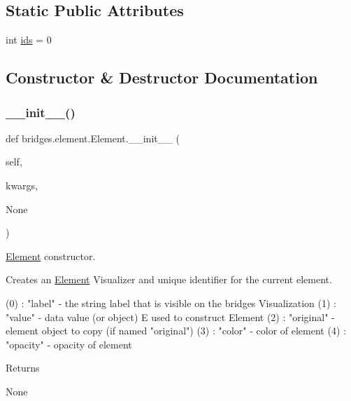 \subsection*{Static Public Attributes}
\begin{DoxyCompactItemize}
\item 
int \hyperlink{classbridges_1_1element_1_1_element_a61f02c915a65554b76dd6534e5a4d834}{ids} = 0
\end{DoxyCompactItemize}


\subsection{Constructor \& Destructor Documentation}
\mbox{\label{classbridges_1_1element_1_1_element_ac0291307e216e5f2da60a340a1e2142d}} 
\subsubsection{\texorpdfstring{\+\_\+\+\_\+init\+\_\+\+\_\+()}{\_\_init\_\_()}}
{\footnotesize\ttfamily def bridges.\+element.\+Element.\+\_\+\+\_\+init\+\_\+\+\_\+ (\begin{DoxyParamCaption}\item[{}]{self,  }\item[{}]{kwargs,  }\item[{}]{None }\end{DoxyParamCaption})}



\hyperlink{classbridges_1_1element_1_1_element}{Element} constructor. 

Creates an \hyperlink{classbridges_1_1element_1_1_element}{Element} Visualizer and unique identifier for the current element. \begin{DoxyVerb}       (0) : "label" - the string label that is visible on the bridges Visualization
       (1) : "value" - data value (or object) E  used to construct Element
       (2) : "original" - element object to copy (if named "original")
       (3) : "color"  - color of element
       (4) : "opacity" - opacity of element
\end{DoxyVerb}
 \begin{DoxyReturn}{Returns}


None 
\end{DoxyReturn}


